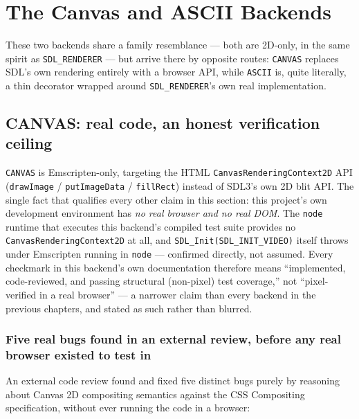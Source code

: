 \chapter{The Canvas and ASCII Backends}
\label{ch:canvas-ascii-backends}

These two backends share a family resemblance --- both are 2D-only, in the same spirit as
\texttt{SDL\_RENDERER} --- but arrive there by opposite routes: \texttt{CANVAS} replaces
SDL's own rendering entirely with a browser API, while \texttt{ASCII} is, quite literally, a
thin decorator wrapped around \texttt{SDL\_RENDERER}'s own real implementation.

\section{CANVAS: real code, an honest verification ceiling}

\texttt{CANVAS} is Emscripten-only, targeting the HTML \texttt{CanvasRenderingContext2D} API
(\texttt{drawImage} / \texttt{putImageData} / \texttt{fillRect}) instead of SDL3's own 2D blit
API. The single fact that qualifies every other claim in this section: this project's own
development environment has \emph{no real browser and no real DOM}. The \texttt{node}
runtime that executes this backend's compiled test suite provides no
\texttt{CanvasRenderingContext2D} at all, and \texttt{SDL\_Init(SDL\_INIT\_VIDEO)} itself
throws under Emscripten running in \texttt{node} --- confirmed directly, not assumed. Every
checkmark in this backend's own documentation therefore means ``implemented, code-reviewed,
and passing structural (non-pixel) test coverage,'' not ``pixel-verified in a real browser''
--- a narrower claim than every backend in the previous chapters, and stated as such rather
than blurred.

\subsection{Five real bugs found in an external review, before any real browser existed to test in}

An external code review found and fixed five distinct bugs purely by reasoning about Canvas
2D compositing semantics against the CSS Compositing specification, without ever running the
code in a browser:

